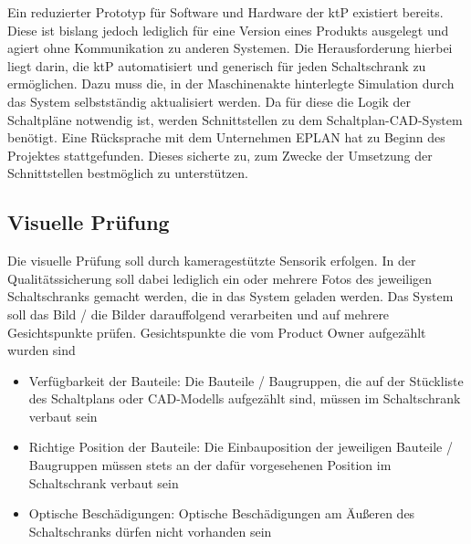 \documentclass[
    type=Projektarbeit,
    status=draft, %
    language=german, %
    bibengine=bibtex,
]{unibwm-inf-thesis}
\begin{document}
    Ein reduzierter Prototyp für Software und Hardware der \ac{ktP} existiert bereits.
    Diese ist bislang jedoch lediglich für eine Version eines Produkts ausgelegt und agiert ohne Kommunikation zu anderen Systemen.
    Die Herausforderung hierbei liegt darin, die \ac{ktP} automatisiert und generisch für jeden Schaltschrank zu ermöglichen.
    Dazu muss die, in der Maschinenakte hinterlegte Simulation durch das System selbstständig aktualisiert werden.
    Da für diese die Logik der Schaltpläne notwendig ist, werden Schnittstellen zu dem Schaltplan-CAD-System benötigt.
    Eine Rücksprache mit dem Unternehmen EPLAN hat zu Beginn des Projektes stattgefunden.
    Dieses sicherte zu, zum Zwecke der Umsetzung der Schnittstellen bestmöglich zu unterstützen.

    
    \subsection{Visuelle Prüfung}\label{subsec:visuelle-prufung}
    Die visuelle Prüfung soll durch kameragestützte Sensorik erfolgen.
    In der Qualitätssicherung soll dabei lediglich ein oder mehrere Fotos des jeweiligen Schaltschranks gemacht werden, die in das System geladen werden.
    Das System soll das Bild / die Bilder darauffolgend verarbeiten und auf mehrere Gesichtspunkte prüfen.
    Gesichtspunkte die vom Product Owner aufgezählt wurden sind
    \begin{itemize}
        \item Verfügbarkeit der Bauteile: Die Bauteile / Baugruppen, die auf der Stückliste des Schaltplans oder
         CAD-Modells aufgezählt sind, müssen im Schaltschrank verbaut sein
        \item Richtige Position der Bauteile: Die Einbauposition der jeweiligen Bauteile / Baugruppen müssen stets an
        der dafür vorgesehenen Position im Schaltschrank verbaut sein
        \item Optische Beschädigungen: Optische Beschädigungen am Äußeren des Schaltschranks dürfen nicht vorhanden sein
    \end{itemize}
\end{document}
